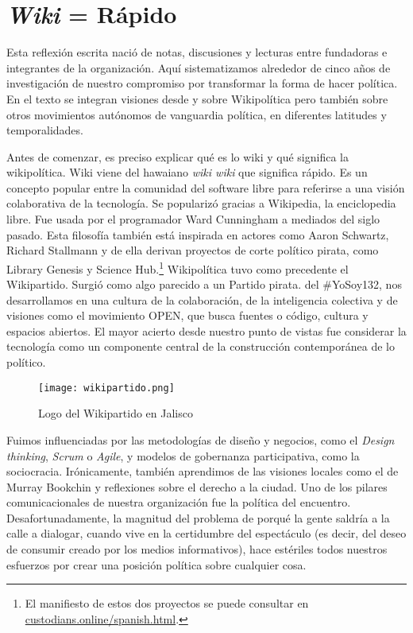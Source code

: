 \chapter{\emph{Wiki} = Rápido}
\label{cha:wiki}

Esta reflexión escrita nació de notas, discusiones y lecturas entre fundadoras e integrantes de la organización. Aquí sistematizamos alrededor de cinco años de investigación de nuestro compromiso por transformar la forma de hacer política. En el texto se integran visiones desde y sobre Wikipolítica pero también sobre otros movimientos autónomos de vanguardia política, en diferentes latitudes y temporalidades.

Antes de comenzar, es preciso explicar qué es lo wiki y qué significa la wikipolítica. Wiki viene del hawaiano \emph{wiki wiki} que significa rápido. Es un concepto popular entre la comunidad del software libre para referirse a una visión colaborativa de la tecnología. Se popularizó gracias a Wikipedia, la enciclopedia libre. Fue usada por el programador Ward Cunningham a mediados del siglo pasado. Esta filosofía también está inspirada en actores como Aaron Schwartz, Richard Stallmann y de ella derivan proyectos de corte político pirata, como Library Genesis y Science Hub.\footnote{El manifiesto de estos dos proyectos se puede consultar en \url{custodians.online/spanish.html}.} Wikipolítica tuvo como precedente el Wikipartido. Surgió como algo parecido a un Partido pirata.  del \#YoSoy132, nos desarrollamos en una cultura de la colaboración, de la inteligencia colectiva y de visiones como el movimiento OPEN,\addref{} que busca fuentes o código, cultura y espacios abiertos. El mayor acierto desde nuestro punto de vistas fue considerar la tecnología como un componente central de la construcción contemporánea de lo político.

\begin{figure}[htbp]
	\centering
	\texttt{[image: wikipartido.png]}
	\caption{Logo del Wikipartido en Jalisco}
	\label{fig:wikilogo}
\end{figure}

Fuimos influenciadas por las metodologías de diseño y negocios, como el \emph{Design thinking}, \emph{Scrum} o \emph{Agile}, y modelos de gobernanza participativa, como la sociocracia. Irónicamente, también aprendimos de las visiones locales como el  de Murray Bookchin\addref{} y reflexiones sobre el derecho a la ciudad.\addref{} Uno de los pilares comunicacionales de nuestra organización fue la política del encuentro. Desafortunadamente, la magnitud del problema de porqué la gente saldría a la calle a dialogar, cuando vive en la certidumbre del espectáculo (es decir, del deseo de consumir creado por los medios informativos), hace estériles todos nuestros esfuerzos por crear una posición política sobre cualquier cosa.

